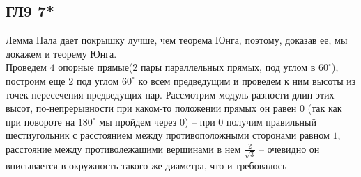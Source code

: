 \subsection*{ГЛ9 7*}
Лемма Пала дает покрышку лучше, чем теорема Юнга, поэтому, доказав ее, мы докажем и теорему Юнга.\\
Проведем $4$ опорные прямые($2$ пары параллельных прямых, под углом в $60^{\circ}$), построим еще $2$ под углом $60^{\circ}$ ко всем предведущим и проведем к ним высоты из точек пересечения предведущих пар. Рассмотрим модуль разности длин этих высот, по-непрерывности при каком-то положении прямых он равен $0$ (так как при повороте на $180^{\circ}$ мы пройдем через $0$) -- при $0$ получим правильный шестиугольник с расстоянием между противоположными сторонами равном $1$, расстояние между противолежащими вершинами в нем $\frac{2}{\sqrt{3}}$ -- очевидно он вписывается в окружность такого же диаметра, что и требовалось	
	
